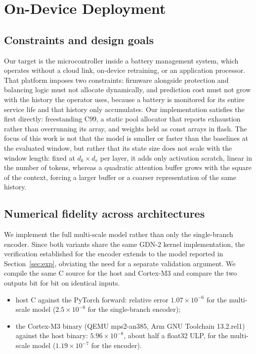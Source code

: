 \documentclass[final,5p,times,twocolumn]{elsarticle}
\begin{document}
\section{On-Device Deployment}
\label{sec:deploy}


\subsection{Constraints and design goals}

Our target is the microcontroller inside a battery management system,
which operates without a cloud link, on-device retraining, or an
application processor. That platform imposes two constraints: firmware
alongside protection and balancing logic must not allocate dynamically,
and prediction cost must not grow with the history the operator uses,
because a battery is monitored for its entire service life and that
history only accumulates. Our implementation satisfies the first
directly: freestanding C99, a static pool allocator that reports
exhaustion rather than overrunning its array, and weights held as
const arrays in flash. The focus of this work is not that the model is smaller or faster 
than the baselines at the evaluated window, but rather that its state size does not scale with the window length: 
fixed at $d_k\times d_v$ per layer, it adds only activation scratch, linear in the number of tokens,
whereas a quadratic attention buffer grows with the square of the
context, forcing a larger buffer or a coarser representation of the same
history.

\subsection{Numerical fidelity across architectures}

We implement the full multi-scale model rather than only the single-branch encoder. 
Since both variants share the same GDN-2 kernel implementation, 
the verification established for the encoder extends to the model reported in Section~\ref{sec:exp},
obviating the need for a separate validation argument. 
We compile the same C source for the host and Cortex-M3 and compare the two outputs bit for bit on identical inputs.


\begin{itemize}
\item host C against the PyTorch forward: relative error
  $1.07\times10^{-6}$ for the multi-scale model
  ($2.5\times10^{-6}$ for the single-branch encoder);
\item the Cortex-M3 binary (QEMU mps2-an385, Arm GNU Toolchain
  13.2.rel1) against the host binary: $5.96\times10^{-8}$, about half a
  float32 ULP, for the multi-scale model ($1.19\times10^{-7}$ for the
  encoder).
\end{itemize}
\end{document}
